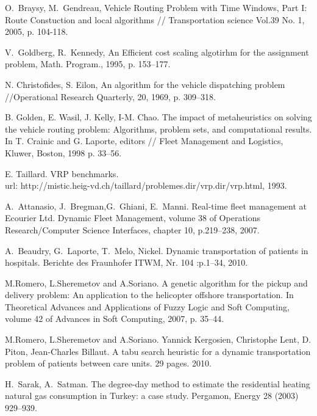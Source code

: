\documentclass[]{TAACpaper}
\begin{document}
\begin{thebibliography}{99}
 O.~Braysy, M.~Gendreau, Vehicle Routing Problem with Time Windows, Part I: Route Constuction and local algorithms // Transportation science Vol.39 No. 1, 2005, p. 104-118.

 V.~Goldberg, R.~Kennedy, An Efficient cost scaling algotirhm for the assignment problem, Math. Program., 1995, p. 153--177.  

  N. Christofides, S. Eilon, An algorithm for the vehicle dispatching problem //Operational Research Quarterly, 20, 1969, p. 309–318.

  B. Golden, E. Wasil, J. Kelly, I-M. Chao. The impact of metaheuristics on solving the vehicle routing problem: Algorithms, problem sets, and computational results. In T. Crainic and G. Laporte, editors // Fleet Management and Logistics, Kluwer, Boston, 1998 p. 33–56.

  E. Taillard. VRP benchmarks.\\ url: http://mistic.heig-vd.ch/taillard/problemes.dir/vrp.dir/vrp.html, 1993.

 A.~Attanasio, J.~Bregman,G.~Ghiani, E.~Manni. Real-time fleet management at Ecourier Ltd. Dynamic Fleet Management, volume 38 of Operations Research/Computer Science Interfaces, chapter 10, p.219--238, 2007.

 A.~Beaudry, G.~Laporte, T.~Melo, Nickel. Dynamic transportation of patients in hospitals. Berichte des Fraunhofer ITWM, Nr. 104 :p.1--34, 2010.

 M.Romero, L.Sheremetov and A.Soriano. A genetic algorithm for the pickup and delivery problem: An application to the helicopter offshore transportation. In Theoretical Advances and Applications of Fuzzy Logic and Soft Computing, volume 42 of Advances in Soft Computing, 2007, p. 35--44.

 M.Romero, L.Sheremetov and A.Soriano. Yannick Kergosien, Christophe Lent, D. Piton, Jean-Charles Billaut. A tabu search heuristic for a dynamic transportation problem of patients between care units. 29 pages. 2010.

 H.~Sarak, A.~Satman. The degree-day method to estimate the residential heating natural gas consumption in Turkey: a case study. Pergamon, Energy 28 (2003) 929--939.
	
\end{thebibliography}
\end{document}
